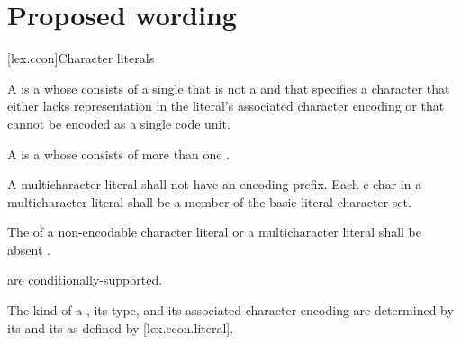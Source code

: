 \documentclass{wg21}
\begin{document}
\section{Proposed wording}



[lex.ccon]{Character literals}

\pnum
{}%
%
%
%
%
%
%
%
%
%
\begin{removedblock}
A 
is a 
whose  consists of a single 
that is not a  and
that specifies a character
that either lacks representation in the literal's associated character encoding
or that cannot be encoded as a single code unit.
\end{removedblock}
A  is a 
whose  consists of
more than one .
\begin{addedblock}
A multicharacter literal shall not have an encoding prefix.
Each c-char in a multicharacter literal shall be a member of the basic literal character set.
\end{addedblock}

\begin{removedblock}
The  of
a non-encodable character literal or
a multicharacter literal
shall be absent .
\end{removedblock}

 are conditionally-supported.

\pnum
The kind of a ,
its type, and its associated character encoding
are determined by
its  and its 
as defined by [lex.ccon.literal].
\end{document}
